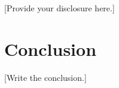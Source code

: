 \documentclass[conference]{IEEEtran}
\begin{document}
[Provide your disclosure here.]



\section{Conclusion}

%

[Write the conclusion.]





\end{document}
